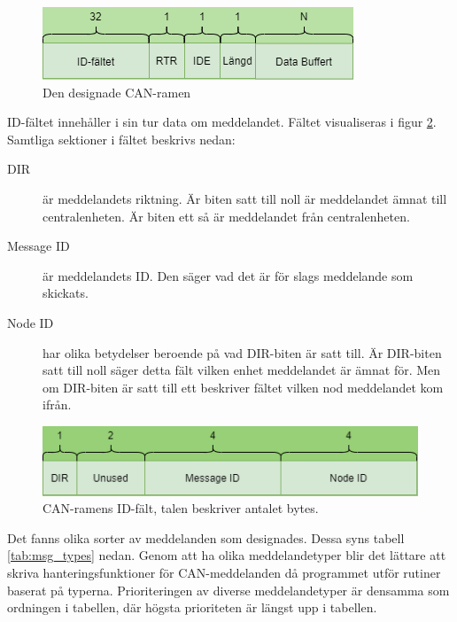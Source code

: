 \begin{figure}[h]
    \centering
    \includegraphics[scale=0.7]{dokumentation/projektrapport/IMAGES/can_frame_own.png}
    \caption{Den designade CAN-ramen}
    \label{fig:can_frame_own}
\end{figure}
\newpage

ID-fältet innehåller i sin tur data om meddelandet. Fältet visualiseras i figur \ref{fig:id_fält}. Samtliga sektioner i fältet beskrivs nedan:
\begin{description}
    \item[DIR] är meddelandets riktning. Är biten satt till noll är meddelandet ämnat till centralenheten. Är biten ett så är meddelandet från centralenheten.
    \item[Message ID] är meddelandets ID. Den säger vad det är för slags meddelande som skickats.
    \item[Node ID] har olika betydelser beroende på vad DIR-biten är satt till. Är DIR-biten satt till noll säger detta fält vilken enhet meddelandet är ämnat för. Men om DIR-biten är satt till ett beskriver fältet vilken nod meddelandet kom ifrån.
\end{description}
\begin{figure}[h]
    \centering
    \includegraphics[scale=0.6]{dokumentation/projektrapport/IMAGES/protocol_new.png}
    \caption{CAN-ramens ID-fält, talen beskriver antalet bytes.}
    \label{fig:id_fält}
\end{figure}

Det fanns olika sorter av meddelanden som designades. Dessa syns tabell \ref{tab:msg_types} nedan. Genom att ha olika meddelandetyper blir det lättare att skriva hanteringsfunktioner för CAN-meddelanden då programmet utför rutiner baserat på typerna. Prioriteringen av diverse meddelandetyper är densamma som ordningen i tabellen, där högsta prioriteten är längst upp i tabellen.

